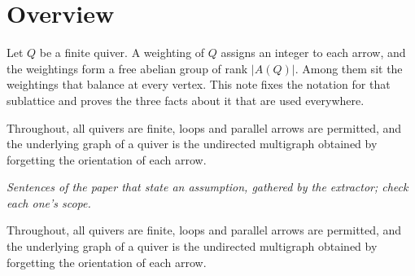 \section*{Overview}
Let $Q$ be a finite quiver. A weighting of $Q$ assigns an integer to each arrow, and the weightings form a free abelian group of rank $|A(Q)|$. Among them sit the weightings that balance at every vertex. This note fixes the notation for that sublattice and proves the three facts about it that are used everywhere.

Throughout, all quivers are finite, loops and parallel arrows are permitted, and the underlying graph of a quiver is the undirected multigraph obtained by forgetting the orientation of each arrow.

\begin{theorem}\label{Arden24-setup}
\emph{Sentences of the paper that state an assumption, gathered by the extractor; check each one's scope.}

Throughout, all quivers are finite, loops and parallel arrows are permitted, and the underlying graph of a quiver is the undirected multigraph obtained by forgetting the orientation of each arrow.
\end{theorem}

